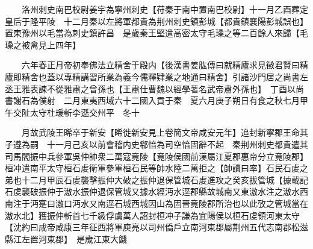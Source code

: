 　　洛州刺史南巴校尉姜宇為寧州刺史【苻秦于南中置南巴校尉】十一月乙酉葬定皇后于隆平陵　十二月秦以左將軍都貴為荆州刺史鎮彭城【都貴鎮襄陽彭城誤也】置東豫州以毛當為刺史鎮許昌　是歲秦王堅遣高密太守毛璪之等二百餘人來歸【毛璪之被禽見上四年】

　　六年春正月帝初奉佛法立精舍于殿内【後漢書姜肱傳曰就精廬求見徵君賢曰精廬即精舍也蓋以專精講習所業為義今儒釋肄業之地通曰精舍】引諸沙門居之尚書左丞王雅表諫不從雅肅之曾孫也【王肅仕曹魏以經學著名武帝肅外孫也】　丁酉以尚書謝石為僕射　二月東夷西域六十二國入貢于秦　夏六月庚子朔日有食之秋七月甲午交阯太守杜瑗斬李遜交州平　冬十

　　月故武陵王晞卒于新安【晞徙新安見上卷簡文帝咸安元年】追封新寧郡王命其子遵為嗣　十一月己亥以前會稽内史郗愔為司空愔固辭不起　秦荆州刺史都貴遣其司馬閻振中兵參軍吳仲帥衆二萬寇竟陵【竟陵侯國前漢屬江夏郡惠帝分立竟陵郡】桓冲遣南平太守桓石䖍衛軍參軍桓石民等帥水陸二萬拒之【帥讀曰率】石民石䖍之弟也十二月甲辰石䖍襲擊振仲大破之振仲退保管城石䖍進攻之癸亥拔管城【據載記石䖍襲破振仲于滶水振仲退保管城又據水經沔水逕郡縣故城南又東滶水注之滶水西南注于沔寔曰滶口沔水又南逕石城西城因山為固晉竟陵郡所治也以此攷之管城當在滶水北】獲振仲斬首七千級俘虜萬人詔封桓冲子謙為宜陽侯以桓石䖍領河東太守【沈約曰成帝咸康三年征西將軍庾亮以司州僑戶立南河東郡屬荆州五代志南郡松滋縣江左置河東郡】　是歲江東大饑

